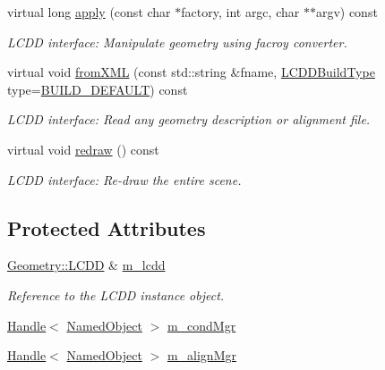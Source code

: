 \begin{DoxyCompactItemize}
virtual long \hyperlink{class_d_d4hep_1_1_r_o_o_t_u_i_a5c620abe4a5288a6b654df105604909e}{apply} (const char $\ast$factory, int argc, char $\ast$$\ast$argv) const
\begin{DoxyCompactList}\small\item\em L\+C\+DD interface\+: Manipulate geometry using facroy converter. \end{DoxyCompactList}\item 
virtual void \hyperlink{class_d_d4hep_1_1_r_o_o_t_u_i_a728864d0e13750c4ea3bf88415559317}{from\+X\+ML} (const std\+::string \&fname, \hyperlink{namespace_d_d4hep_acafe43ba4537ab6e999e808142965fab}{L\+C\+D\+D\+Build\+Type} type=\hyperlink{namespace_d_d4hep_acafe43ba4537ab6e999e808142965fabaceac720f961afd2369fcc9f343113a2e}{B\+U\+I\+L\+D\+\_\+\+D\+E\+F\+A\+U\+LT}) const
\begin{DoxyCompactList}\small\item\em L\+C\+DD interface\+: Read any geometry description or alignment file. \end{DoxyCompactList}\item 
virtual void \hyperlink{class_d_d4hep_1_1_r_o_o_t_u_i_add931e9648b58abc61034adb173295d3}{redraw} () const
\begin{DoxyCompactList}\small\item\em L\+C\+DD interface\+: Re-\/draw the entire scene. \end{DoxyCompactList}\end{DoxyCompactItemize}
\subsection*{Protected Attributes}
\begin{DoxyCompactItemize}
\item 
\hyperlink{class_d_d4hep_1_1_geometry_1_1_l_c_d_d}{Geometry\+::\+L\+C\+DD} \& \hyperlink{class_d_d4hep_1_1_r_o_o_t_u_i_a5ee50c37b731dbace8e02609727c937d}{m\+\_\+lcdd}
\begin{DoxyCompactList}\small\item\em Reference to the L\+C\+DD instance object. \end{DoxyCompactList}\item 
\hyperlink{class_d_d4hep_1_1_handle}{Handle}$<$ \hyperlink{class_d_d4hep_1_1_named_object}{Named\+Object} $>$ \hyperlink{class_d_d4hep_1_1_r_o_o_t_u_i_aad76877df2fc04d079cf63b9898c123a}{m\+\_\+cond\+Mgr}
\item 
\hyperlink{class_d_d4hep_1_1_handle}{Handle}$<$ \hyperlink{class_d_d4hep_1_1_named_object}{Named\+Object} $>$ \hyperlink{class_d_d4hep_1_1_r_o_o_t_u_i_a4e3cba5482c1e2fa75291a27437d039b}{m\+\_\+align\+Mgr}
\end{DoxyCompactItemize}


